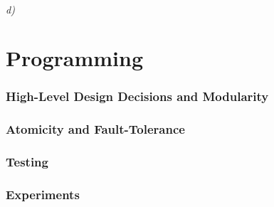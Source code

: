 \documentclass[a4paper, 11pt]{article}
\begin{document}

\paragraph{d)} %




\part{Programming} %
\label{prt:programming_}

\section{High-Level Design Decisions and Modularity} %
\label{sec:high_level_design_decisions_and_modularity}


\section{Atomicity and Fault-Tolerance} %
\label{sec:atomicity_and_fault_tolerance}


\section{Testing} %
\label{sec:testing}


\section{Experiments} %
\label{sec:experiments}


\end{document}
